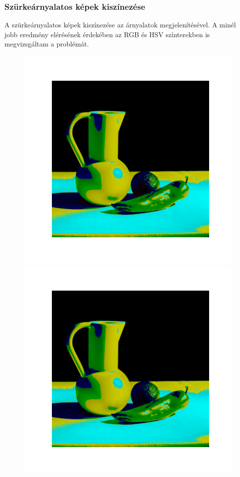 \documentclass{beamer}
\begin{document}
\begin{frame}[fragile]
\frametitle{Szürkeárnyalatos képek kiszínezése}
A szürkeárnyalatos képek kiszínezése az árnyalatok megjelenítésével. A minél jobb eredmény elérésének érdekében az RGB és HSV színterekben is megvizsgáltam a problémát.
\begin{figure}[!tbp]
  \centering
  \begin{minipage}[b]{0.4\textwidth}
    \includegraphics[width=\textwidth]{images/colorized_rgb.png}
  \end{minipage}
  \begin{minipage}[b]{0.4\textwidth}
    \includegraphics[width=\textwidth]{images/colorized_hsv.png}
  \end{minipage}
\end{figure}
\end{frame}
\end{document}
